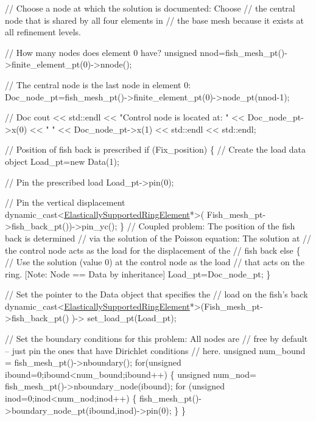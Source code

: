 \begin{DoxyCodeInclude}
{ \textcolor{comment}{// Choose a node at which the solution is documented: Choose}
 \textcolor{comment}{// the central node that is shared by all four elements in}
 \textcolor{comment}{// the base mesh because it exists at all refinement levels.}
 
 \textcolor{comment}{// How many nodes does element 0 have?}
 \textcolor{keywordtype}{unsigned} nnod=fish\_mesh\_pt()->finite\_element\_pt(0)->nnode();

 \textcolor{comment}{// The central node is the last node in element 0:}
 Doc\_node\_pt=fish\_mesh\_pt()->finite\_element\_pt(0)->node\_pt(nnod-1);

 \textcolor{comment}{// Doc}
 cout << std::endl <<  \textcolor{stringliteral}{"Control node is located at: "} 
      << Doc\_node\_pt->x(0) << \textcolor{stringliteral}{" "} << Doc\_node\_pt->x(1) 
      << std::endl << std::endl;

 \textcolor{comment}{// Position of fish back is prescribed}
 \textcolor{keywordflow}{if} (Fix\_position)
  \{
   \textcolor{comment}{// Create the load data object}
   Load\_pt=\textcolor{keyword}{new} Data(1);
   
   \textcolor{comment}{// Pin the prescribed load}
   Load\_pt->pin(0);

   \textcolor{comment}{// Pin the vertical displacement}
   \textcolor{keyword}{dynamic\_cast<}\hyperlink{classoomph_1_1ElasticallySupportedRingElement}{ElasticallySupportedRingElement}*\textcolor{keyword}{>}(
    Fish\_mesh\_pt->fish\_back\_pt())->pin\_yc();
  \}
 \textcolor{comment}{// Coupled problem: The position of the fish back is determined}
 \textcolor{comment}{// via the solution of the Poisson equation: The solution at}
 \textcolor{comment}{// the control node acts as the load for the displacement of the}
 \textcolor{comment}{// fish back}
 \textcolor{keywordflow}{else}
  \{   
   \textcolor{comment}{// Use the solution (value 0) at the control node as the load}
   \textcolor{comment}{// that acts on the ring. [Note: Node == Data by inheritance]}
   Load\_pt=Doc\_node\_pt;
  \}


 \textcolor{comment}{// Set the pointer to the Data object that specifies the }
 \textcolor{comment}{// load on the fish's back}
 \textcolor{keyword}{dynamic\_cast<}\hyperlink{classoomph_1_1ElasticallySupportedRingElement}{ElasticallySupportedRingElement}*\textcolor{keyword}{>}(Fish\_mesh\_pt->fish\_back\_pt()
      )->
  set\_load\_pt(Load\_pt);
 

 \textcolor{comment}{// Set the boundary conditions for this problem: All nodes are}
 \textcolor{comment}{// free by default -- just pin the ones that have Dirichlet conditions}
 \textcolor{comment}{// here. }
 \textcolor{keywordtype}{unsigned} num\_bound = fish\_mesh\_pt()->nboundary();
 \textcolor{keywordflow}{for}(\textcolor{keywordtype}{unsigned} ibound=0;ibound<num\_bound;ibound++)
  \{
   \textcolor{keywordtype}{unsigned} num\_nod= fish\_mesh\_pt()->nboundary\_node(ibound);
   \textcolor{keywordflow}{for} (\textcolor{keywordtype}{unsigned} inod=0;inod<num\_nod;inod++)
    \{
     fish\_mesh\_pt()->boundary\_node\_pt(ibound,inod)->pin(0); 
    \}
  \}


}
\end{DoxyCodeInclude}
